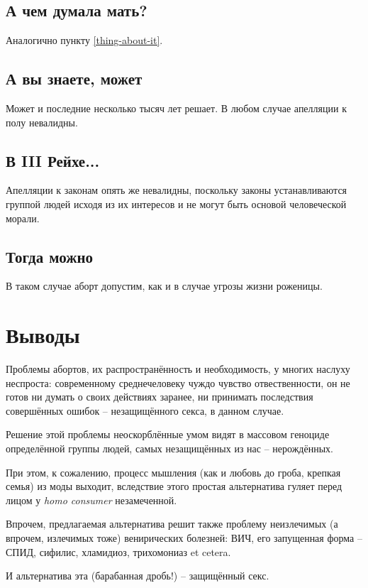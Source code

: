 \documentclass[a4paper,12pt]{report}
\begin{document}
	\section{А чем думала мать?}
        Аналогично пункту \ref{thing-about-it}.
    \section{А вы знаете, может}
        Может и последние несколько тысяч лет решает. В любом случае апелляции к полу невалидны.
    \section{В III Рейхе...}\label{laws}
        Апелляции к законам опять же невалидны, поскольку законы устанавливаются группой 
        людей исходя из их интересов и не могут быть основой человеческой морали. 
	\section{Тогда можно}
        В таком случае аборт допустим, как и в случае угрозы жизни роженицы.


\chapter{Выводы}
Проблемы абортов, их распространённость и необходимость, у многих наслуху неспроста: 
современному среднечеловеку чуждо чувство отвественности, он не готов ни думать о 
своих действиях заранее, ни принимать последствия совершённых ошибок -- незащищённого 
секса, в данном случае.

Решение этой проблемы неоскорблённые умом видят в массовом геноциде определённой 
группы людей, самых незащищённых из нас --  нерождённых. 

При этом, к сожалению, процесс мышления (как и любовь до гроба, крепкая семья) из 
моды выходит, вследствие этого простая альтернатива гуляет перед лицом у \textit{homo consumer} 
незамеченной. 

Впрочем, предлагаемая альтернатива решит также проблему неизлечимых (а впрочем, 
излечимых тоже) венирических болезней: ВИЧ, его запущенная форма -- СПИД, 
сифилис, хламидиоз, трихомониаз et cetera.

И альтернатива эта (барабанная дробь!) -- защищённый секс.
\end{document}
